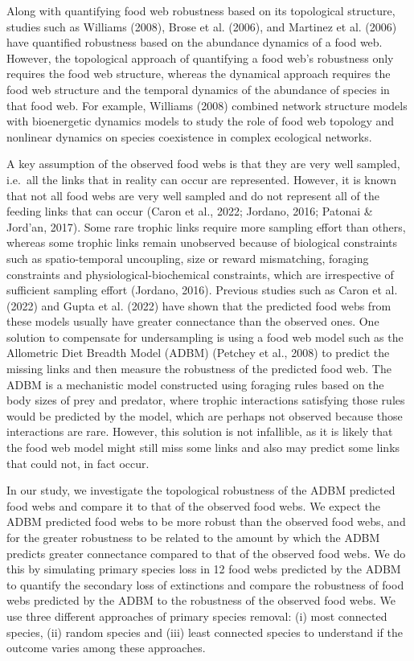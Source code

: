 \documentclass{article}
\begin{document}
Along with quantifying food web robustness based on its topological
structure, studies such as Williams (2008), Brose et al. (2006), and
Martinez et al. (2006) have quantified robustness based on the abundance
dynamics of a food web. However, the topological approach of quantifying
a food web's robustness only requires the food web structure, whereas
the dynamical approach requires the food web structure and the temporal
dynamics of the abundance of species in that food web. For example,
Williams (2008) combined network structure models with bioenergetic
dynamics models to study the role of food web topology and nonlinear
dynamics on species coexistence in complex ecological networks.

A key assumption of the observed food webs is that they are very well
sampled, i.e.~all the links that in reality can occur are represented.
However, it is known that not all food webs are very well sampled and do
not represent all of the feeding links that can occur (Caron et al.,
2022; Jordano, 2016; Patonai \& Jord'an, 2017). Some rare trophic links
require more sampling effort than others, whereas some trophic links
remain unobserved because of biological constraints such as
spatio-temporal uncoupling, size or reward mismatching, foraging
constraints and physiological-biochemical constraints, which are
irrespective of sufficient sampling effort (Jordano, 2016). Previous
studies such as Caron et al. (2022) and Gupta et al. (2022) have shown
that the predicted food webs from these models usually have greater
connectance than the observed ones. One solution to compensate for
undersampling is using a food web model such as the Allometric Diet
Breadth Model (ADBM) (Petchey et al., 2008) to predict the missing links
and then measure the robustness of the predicted food web. The ADBM is a
mechanistic model constructed using foraging rules based on the body
sizes of prey and predator, where trophic interactions satisfying those
rules would be predicted by the model, which are perhaps not observed
because those interactions are rare. However, this solution is not
infallible, as it is likely that the food web model might still miss
some links and also may predict some links that could not, in fact
occur.

In our study, we investigate the topological robustness of the ADBM
predicted food webs and compare it to that of the observed food webs. We
expect the ADBM predicted food webs to be more robust than the observed
food webs, and for the greater robustness to be related to the amount by
which the ADBM predicts greater connectance compared to that of the
observed food webs. We do this by simulating primary species loss in 12
food webs predicted by the ADBM to quantify the secondary loss of
extinctions and compare the robustness of food webs predicted by the
ADBM to the robustness of the observed food webs. We use three different
approaches of primary species removal: (i) most connected species, (ii)
random species and (iii) least connected species to understand if the
outcome varies among these approaches.
\end{document}
